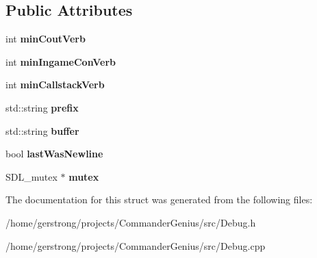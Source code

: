 \subsection*{Public Attributes}
\begin{DoxyCompactItemize}
\item 
\hypertarget{struct_logger_a95610d70ef0244c7395e1cf1c0d3347b}{
int {\bfseries minCoutVerb}}
\label{struct_logger_a95610d70ef0244c7395e1cf1c0d3347b}

\item 
\hypertarget{struct_logger_aac8ecc289e8d56946a38d8036e8bcb2f}{
int {\bfseries minIngameConVerb}}
\label{struct_logger_aac8ecc289e8d56946a38d8036e8bcb2f}

\item 
\hypertarget{struct_logger_af9b735b97e3b548dd2f51248e5306da8}{
int {\bfseries minCallstackVerb}}
\label{struct_logger_af9b735b97e3b548dd2f51248e5306da8}

\item 
\hypertarget{struct_logger_a1ece42ce29de189ccbf0ad0034bc8339}{
std::string {\bfseries prefix}}
\label{struct_logger_a1ece42ce29de189ccbf0ad0034bc8339}

\item 
\hypertarget{struct_logger_ac43d3a965767987a82bbabca45729aa9}{
std::string {\bfseries buffer}}
\label{struct_logger_ac43d3a965767987a82bbabca45729aa9}

\item 
\hypertarget{struct_logger_abffac11bd28572312dbeaba610b76158}{
bool {\bfseries lastWasNewline}}
\label{struct_logger_abffac11bd28572312dbeaba610b76158}

\item 
\hypertarget{struct_logger_a3b138e0abdc7f640f624ee01fe14102d}{
SDL\_\-mutex $\ast$ {\bfseries mutex}}
\label{struct_logger_a3b138e0abdc7f640f624ee01fe14102d}

\end{DoxyCompactItemize}


The documentation for this struct was generated from the following files:\begin{DoxyCompactItemize}
\item 
/home/gerstrong/projects/CommanderGenius/src/Debug.h\item 
/home/gerstrong/projects/CommanderGenius/src/Debug.cpp\end{DoxyCompactItemize}
